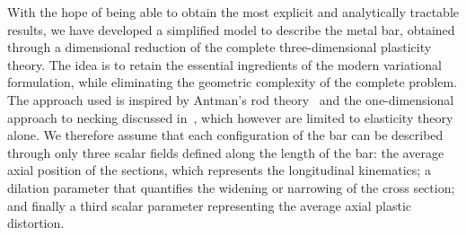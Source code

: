 \documentclass[a4paper,10pt,oneside]{amsbook}
\numberwithin{section}{chapter}
\numberwithin{equation}{chapter}
\theoremstyle{definition}
\begin{document}

With the hope of being able to obtain the most explicit and analytically tractable results, we have developed a simplified model to describe the metal bar, obtained through a dimensional reduction of the complete three-dimensional plasticity theory. The idea is to retain the essential ingredients of the modern variational formulation, while eliminating the geometric complexity of the complete problem. The approach used is inspired by Antman's rod theory~\cite{antman} and the one-dimensional approach to necking discussed in~\cite{AudolyHutchinson2020}, which however are limited to elasticity theory alone. We therefore assume that each configuration of the bar can be described through only three scalar fields defined along the length of the bar: the average axial position of the sections, which represents the longitudinal kinematics; a dilation parameter that quantifies the widening or narrowing of the cross section; and finally a third scalar parameter representing the average axial plastic distortion.
\end{document}
